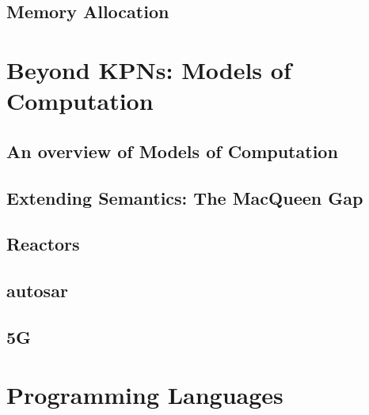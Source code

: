 \documentclass{report}
\begin{document}
\section{Memory Allocation}

%
%
%


%

\chapter{Beyond \acsp{KPN}: Models of Computation}
\label{chap:mocs}

\section{An overview of Models of Computation}

\section{Extending Semantics: The MacQueen Gap} %
\section{Reactors}
\section{autosar}
\section{5G}

\chapter{Programming Languages}

\end{document}
